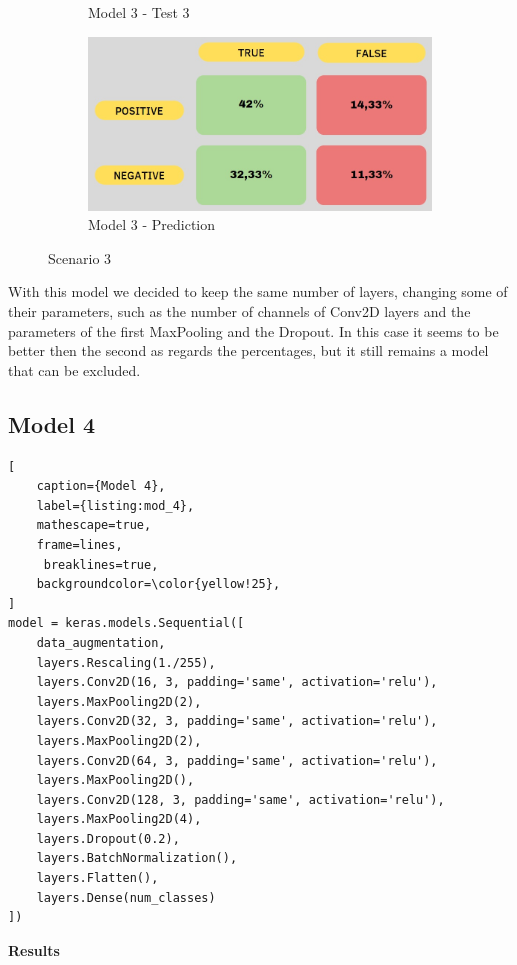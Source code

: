 \documentclass[a4paper,12pt]{article}
\begin{document}
\begin{figure}
\begin{subfigure}{6cm}
        \caption{ Model 3 - Test 3}
    \end{subfigure}
     \begin{subfigure}{6cm}
        \includegraphics[width=\linewidth]{images_latex/model3.jpg}
        \caption{ Model 3 - Prediction}
    \end{subfigure}
    \caption{Scenario 3}%
\end{figure}

With this model we decided to keep the same number of layers, changing some of their parameters, such as the number of channels of Conv2D layers and the parameters of the first MaxPooling and the Dropout. 
In this case it seems to be better then the second as regards the percentages, but it still remains a model that can be excluded. 

\newpage
\subsection{Model 4}
\begin{lstlisting}[
    caption={Model 4},
    label={listing:mod_4},
    mathescape=true, 
    frame=lines,
     breaklines=true,
    backgroundcolor=\color{yellow!25},
]
model = keras.models.Sequential([
    data_augmentation,
    layers.Rescaling(1./255), 
    layers.Conv2D(16, 3, padding='same', activation='relu'),
    layers.MaxPooling2D(2),
    layers.Conv2D(32, 3, padding='same', activation='relu'),
    layers.MaxPooling2D(2),
    layers.Conv2D(64, 3, padding='same', activation='relu'),
    layers.MaxPooling2D(),
    layers.Conv2D(128, 3, padding='same', activation='relu'),
    layers.MaxPooling2D(4),
    layers.Dropout(0.2),
    layers.BatchNormalization(), 
    layers.Flatten(),
    layers.Dense(num_classes)
])
\end{lstlisting}

\textbf{Results}
\end{document}
